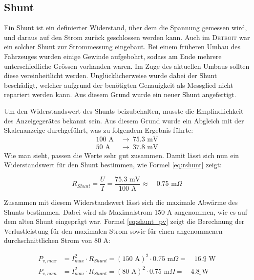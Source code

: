 \subsection{Shunt}
Ein Shunt ist ein definierter Widerstand, über dem die Spannung gemessen wird, und daraus auf den Strom zurück geschlossen werden kann. Auch im \textsc{Detroit} war ein solcher Shunt zur Strommessung eingebaut. Bei einem früheren Umbau des Fahrzeuges wurden einige Gewinde aufgebohrt, sodass am Ende mehrere unterschiedliche Grössen vorhanden waren. Im Zuge des aktuellen Umbaus sollten diese vereinheitlicht werden. Unglücklicherweise wurde dabei der Shunt beschädigt, welcher aufgrund der benötigten Genauigkeit als Messglied nicht repariert werden kann. Aus diesem Grund wurde ein neuer Shunt angefertigt.

Um den Widerstandswert des Shunts beizubehalten, musste die Empfindlichkeit des Anzeigegerätes bekannt sein. Aus diesem Grund wurde ein Abgleich mit der Skalenanzeige durchgeführt, was zu folgendem Ergebnis führte:
\begin{equation*}\begin{aligned}
	100\text{ A}\ &\rightarrow\ 75.3\text{ mV}\\
	50\text{ A}\ &\rightarrow\ 37.8\text{ mV}
\end{aligned}\end{equation*}
Wie man sieht, passen die Werte sehr gut zusammen. Damit lässt sich nun ein Widerstandswert für den Shunt bestimmen, wie Formel \ref{eq:rshunt} zeigt:

\begin{equation}
R_{Shunt}=\frac{U}{I}=\frac{75.3\text{ mV}}{100\text{ A}}\approx\quad\underline{0.75\text{ m}\Omega}
\label{eq:rshunt}
\end{equation}

Zusammen mit diesem Widerstandswert lässt sich die maximale Abwärme des Shunts bestimmen. Dabei wird als Maximalstrom $150$ A angenommen, wie es auf dem alten Shunt eingeprägt war. Formel \ref{eq:shunt_pv} zeigt die Berechnung der Verlustleistung für den maximalen Strom sowie für einen angenommenen durchschnittlichen Strom von $80$ A:

\begin{equation}\begin{aligned}
	P_{v,max}&=I_{max}^2\cdot R_{Shunt}=\left(150\text{ A}\right)^2\cdot0.75\text{ m}\Omega=\quad\underline{16.9\text{ W}}\\[6pt]
	P_{v,nom}&=I_{nom}^2\cdot R_{Shunt}=\left(80\text{ A}\right)^2\cdot0.75\text{ m}\Omega=\quad\underline{4.8 \text{ W}}
\label{eq:shunt_pv}
\end{aligned}\end{equation}

